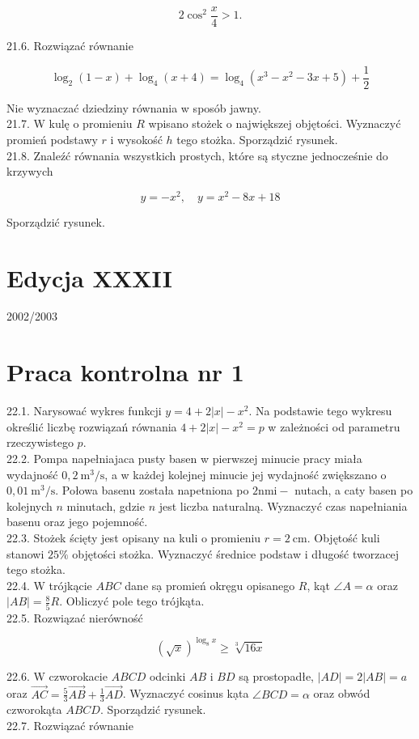 \documentclass[10pt]{article}
\begin{document}
$$
2 \cos ^{2} \frac{x}{4}>1 .
$$

21.6. Rozwiązać równanie

$$
\log _{2}(1-x)+\log _{4}(x+4)=\log _{4}\left(x^{3}-x^{2}-3 x+5\right)+\frac{1}{2}
$$

Nie wyznaczać dziedziny równania w sposób jawny.\\
21.7. W kulę o promieniu $R$ wpisano stożek o największej objętości. Wyznaczyć promień podstawy $r$ i wysokość $h$ tego stożka. Sporządzić rysunek.\\
21.8. Znaleźć równania wszystkich prostych, które są styczne jednocześnie do krzywych

$$
y=-x^{2}, \quad y=x^{2}-8 x+18
$$

Sporządzić rysunek.

\section*{Edycja XXXII}
2002/2003

\section*{Praca kontrolna nr 1}
22.1. Narysować wykres funkcji $y=4+2|x|-x^{2}$. Na podstawie tego wykresu określić liczbę rozwiązań równania $4+2|x|-x^{2}=p$ w zależności od parametru rzeczywistego $p$.\\
22.2. Pompa napełniajaca pusty basen w pierwszej minucie pracy miała wydajność $0,2 \mathrm{~m}^{3} / \mathrm{s}$, a w każdej kolejnej minucie jej wydajność zwiększano o $0,01 \mathrm{~m}^{3} / \mathrm{s}$. Połowa basenu została napetniona po $2 \mathrm{n} \mathrm{mi-}$ nutach, a caty basen po kolejnych $n$ minutach, gdzie $n$ jest liczba naturalną. Wyznaczyć czas napełniania basenu oraz jego pojemność.\\
22.3. Stożek ścięty jest opisany na kuli o promieniu $r=2 \mathrm{~cm}$. Objętość kuli stanowi $25 \%$ objętości stożka. Wyznaczyć średnice podstaw i długość tworzacej tego stożka.\\
22.4. W trójkącie $A B C$ dane sạ promień okręgu opisanego $R$, kąt $\angle A=\alpha$ oraz $|A B|=\frac{8}{5} R$. Obliczyć pole tego trójkąta.\\
22.5. Rozwiązać nierówność

$$
(\sqrt{x})^{\log _{8} x} \geq \sqrt[3]{16 x}
$$

22.6. W czworokacie $A B C D$ odcinki $A B$ i $B D$ są prostopadłe, $|A D|=2|A B|=a$ oraz $\overrightarrow{A C}=\frac{5}{3} \overrightarrow{A B}+\frac{1}{3} \overrightarrow{A D}$. Wyznaczyć cosinus kạta $\angle B C D=\alpha$ oraz obwód czworokąta $A B C D$. Sporządzić rysunek.\\
22.7. Rozwiązać równanie
\end{document}
